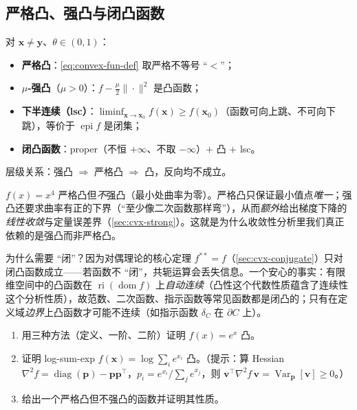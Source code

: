 \subsection{严格凸、强凸与闭凸函数}
\label{subsec:cvx-fun-types}

\begin{definition}[凸 / 严格凸 / 强凸 / 闭凸]\label{def:cvx-strength}
对 $\mathbf x\neq\mathbf y$、$\theta\in(0,1)$：
\begin{itemize}
  \item \textbf{严格凸}：\cref{eq:convex-fun-def} 取严格不等号 “$<$”；
  \item \textbf{$\mu$-强凸}（$\mu>0$）：$f-\tfrac{\mu}{2}\|\cdot\|^2$ 是凸函数；
  \item \textbf{下半连续（lsc）}：$\liminf_{\mathbf x\to\mathbf x_0}f(\mathbf x)\ge f(\mathbf x_0)$（函数可向上跳、不可向下跳），等价于 $\operatorname{epi}f$ 是闭集；
  \item \textbf{闭凸函数}：proper（不恒 $+\infty$、不取 $-\infty$）$+$ 凸 $+$ lsc。
\end{itemize}
层级关系：强凸 $\Rightarrow$ 严格凸 $\Rightarrow$ 凸，反向均不成立。
\end{definition}

\begin{insight}[为何强凸远比严格凸重要]\label{ins:strong-vs-strict}
$f(x)=x^4$ 严格凸但\emph{不}强凸（最小处曲率为零）。严格凸只保证最小值点\emph{唯一}；强凸还要求曲率有正的下界（“至少像二次函数那样弯”），从而\emph{额外}给出梯度下降的\emph{线性收敛}与定量误差界（\cref{sec:cvx-strong}）。这就是为什么收敛性分析里我们真正依赖的是强凸而非严格凸。
\end{insight}

为什么需要 “闭”？因为对偶理论的核心定理 $f^{\ast\ast}=f$（\cref{sec:cvx-conjugate}）只对闭凸函数成立——若函数不 “闭”，共轭运算会丢失信息。一个安心的事实：有限维空间中的凸函数在 $\operatorname{ri}(\operatorname{dom}f)$ 上\emph{自动连续}（凸性这个代数性质蕴含了连续性这个分析性质），故范数、二次函数、指示函数等常见函数都是闭凸的；只有在定义域\emph{边界}上凸函数才可能不连续（如指示函数 $\delta_C$ 在 $\partial C$ 上）。

\begin{practice}
\begin{enumerate}
  \item 用三种方法（定义、一阶、二阶）证明 $f(x)=e^x$ 凸。
  \item 证明 log-sum-exp $f(\mathbf x)=\log\sum_i e^{x_i}$ 凸。（提示：算 Hessian $\nabla^2 f=\operatorname{diag}(\mathbf p)-\mathbf p\mathbf p^\top$，$p_i=e^{x_i}/\sum_j e^{x_j}$，则 $\mathbf v^\top\nabla^2 f\,\mathbf v=\operatorname{Var}_{\mathbf p}[\mathbf v]\ge0$。）
  \item 给出一个严格凸但不强凸的函数并证明其性质。
\end{enumerate}
\end{practice}


